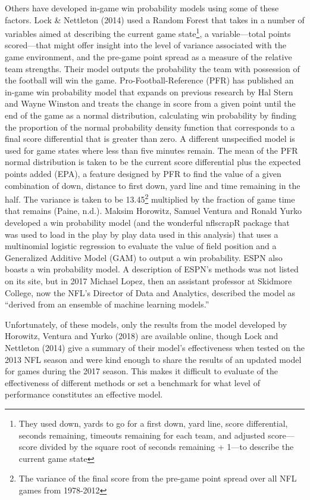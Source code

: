 \documentclass[12pt,twoside]{dukestatscithesis}
\begin{document}
Others have developed in-game win probability models using some of these factors. Lock \& Nettleton (2014) used a Random Forest that takes in a number of variables aimed at describing the current game state\footnote{They used down, yards to go for a first down, yard line, score differential, seconds remaining, timeouts remaining for each team, and adjusted score---score divided by the square root of seconds remaining + 1---to describe the current game state}, a variable---total points scored---that might offer insight into the level of variance associated with the game environment, and the pre-game point spread as a measure of the relative team strengths. Their model outputs the probability the team with possession of the football will win the game. Pro-Football-Reference (PFR) has published an in-game win probability model that expands on previous research by Hal Stern and Wayne Winston and treats the change in score from a given point until the end of the game as a normal distribution, calculating win probability by finding the proportion of the normal probability density function that corresponds to a final score differential that is greater than zero. A different unspecified model is used for game states where less than five minutes remain. The mean of the PFR normal distribution is taken to be the current score differential plus the expected points added (EPA), a feature designed by PFR to find the value of a given combination of down, distance to first down, yard line and time remaining in the half. The variance is taken to be 13.45\footnote{The variance of the final score from the pre-game point spread over all NFL games from 1978-2012} multiplied by the fraction of game time that remains (Paine, n.d.). Maksim Horowitz, Samuel Ventura and Ronald Yurko developed a win probability model (and the wonderful nflscrapR package that was used to load in the play by play data used in this analysis) that uses a multinomial logistic regression to evaluate the value of field position and a Generalized Additive Model (GAM) to output a win probability. ESPN also boasts a win probability model. A description of ESPN's methods was not listed on its site, but in 2017 Michael Lopez, then an assistant professor at Skidmore College, now the NFL's Director of Data and Analytics, described the model as ``derived from an ensemble of machine learning models.''

Unfortunately, of these models, only the results from the model developed by Horowitz, Ventura and Yurko (2018) are available online, though Lock and Nettleton (2014) give a summary of their model's effectiveness when tested on the 2013 NFL season and were kind enough to share the results of an updated model for games during the 2017 season. This makes it difficult to evaluate of the effectiveness of different methods or set a benchmark for what level of performance constitutes an effective model.
\end{document}
